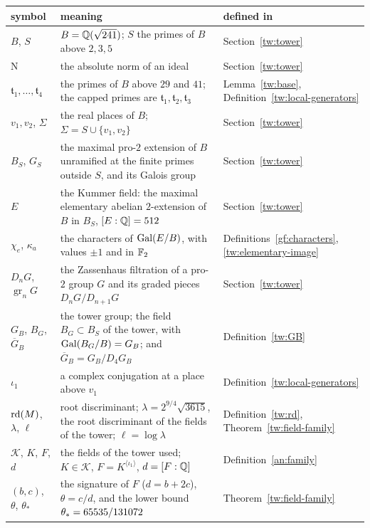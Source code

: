 \smallskip
{\small
\begin{longtable}{@{}>{\raggedright\arraybackslash}p{}>{\raggedright\arraybackslash}p{}>{\raggedright\arraybackslash}p{}@{}}
\toprule
symbol & meaning & defined in\\
\midrule\endhead
$B$, $S$ & $B=\mathbb Q(\sqrt{241})$; $S$ the primes of $B$ above $2,3,5$ & Section~\ref{tw:tower}\\
$\mathrm N$ & the absolute norm of an ideal & Section~\ref{tw:tower}\\
$\mathfrak t_1,\dots,\mathfrak t_4$ & the primes of $B$ above $29$ and $41$; the capped primes are $\mathfrak t_1,\mathfrak t_2,\mathfrak t_3$ & Lemma~\ref{tw:base}, Definition~\ref{tw:local-generators}\\
$v_1,v_2$, $\Sigma$ & the real places of $B$; $\Sigma=S\cup\{v_1,v_2\}$ & Section~\ref{tw:tower}\\
$B_S$, $G_S$ & the maximal pro-$2$ extension of $B$ unramified at the finite primes outside $S$, and its Galois group & Section~\ref{tw:tower}\\
$E$ & the Kummer field: the maximal elementary abelian $2$-extension of $B$ in $B_S$, $[E:\mathbb Q]=512$ & Section~\ref{tw:tower}\\
$\chi_e$, $\kappa_a$ & the characters of $\operatorname{Gal}(E/B)$, with values $\pm1$ and in $\mathbb F_2$ & Definitions~\ref{gf:characters}, \ref{tw:elementary-image}\\
$D_nG$, $\operatorname{gr}_nG$ & the Zassenhaus filtration of a pro-$2$ group $G$ and its graded pieces $D_nG/D_{n+1}G$ & Section~\ref{tw:tower}\\
$G_B$, $B_G$, $\overline G_B$ & the tower group; the field $B_G\subset B_S$ of the tower, with $\operatorname{Gal}(B_G/B)=G_B$; and $\overline G_B=G_B/D_4G_B$ & Definition~\ref{tw:GB}\\
$\iota_1$ & a complex conjugation at a place above $v_1$ & Definition~\ref{tw:local-generators}\\
$\operatorname{rd}(M)$, $\lambda$, $\ell$ & root discriminant; $\lambda=2^{9/4}\sqrt{3615}$, the root discriminant of the fields of the tower; $\ell=\log\lambda$ & Definition~\ref{tw:rd}, Theorem~\ref{tw:field-family}\\
$\mathcal K$, $K$, $F$, $d$ & the fields of the tower used; $K\in\mathcal K$, $F=K^{\langle\iota_1\rangle}$, $d=[F:\mathbb Q]$ & Definition~\ref{an:family}\\
$(b,c)$, $\theta$, $\theta_*$ & the signature of $F$ ($d=b+2c$), $\theta=c/d$, and the lower bound $\theta_*=65535/131072$ & Theorem~\ref{tw:field-family}\\

\end{longtable}}
